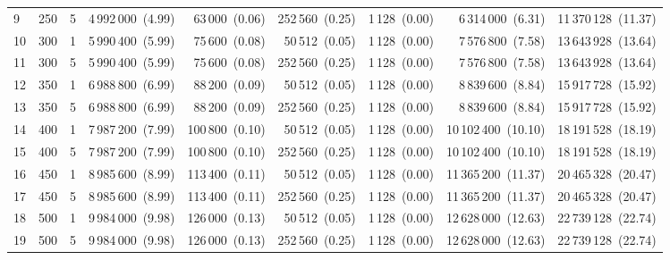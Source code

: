 \begin{tabular}{lllrrrrrr}
\cline{1-9} \cline{2-9}
9 & 250 & 5 & 4\,992\,000~{\footnotesize(4.99)} & 63\,000~{\footnotesize(0.06)} & 252\,560~{\footnotesize(0.25)} & 1\,128~{\footnotesize(0.00)} & 6\,314\,000~{\footnotesize(6.31)} & 11\,370\,128~{\footnotesize(11.37)} \\
\cline{1-9} \cline{2-9}
10 & 300 & 1 & 5\,990\,400~{\footnotesize(5.99)} & 75\,600~{\footnotesize(0.08)} & 50\,512~{\footnotesize(0.05)} & 1\,128~{\footnotesize(0.00)} & 7\,576\,800~{\footnotesize(7.58)} & 13\,643\,928~{\footnotesize(13.64)} \\
\cline{1-9} \cline{2-9}
11 & 300 & 5 & 5\,990\,400~{\footnotesize(5.99)} & 75\,600~{\footnotesize(0.08)} & 252\,560~{\footnotesize(0.25)} & 1\,128~{\footnotesize(0.00)} & 7\,576\,800~{\footnotesize(7.58)} & 13\,643\,928~{\footnotesize(13.64)} \\
\cline{1-9} \cline{2-9}
12 & 350 & 1 & 6\,988\,800~{\footnotesize(6.99)} & 88\,200~{\footnotesize(0.09)} & 50\,512~{\footnotesize(0.05)} & 1\,128~{\footnotesize(0.00)} & 8\,839\,600~{\footnotesize(8.84)} & 15\,917\,728~{\footnotesize(15.92)} \\
\cline{1-9} \cline{2-9}
13 & 350 & 5 & 6\,988\,800~{\footnotesize(6.99)} & 88\,200~{\footnotesize(0.09)} & 252\,560~{\footnotesize(0.25)} & 1\,128~{\footnotesize(0.00)} & 8\,839\,600~{\footnotesize(8.84)} & 15\,917\,728~{\footnotesize(15.92)} \\
\cline{1-9} \cline{2-9}
14 & 400 & 1 & 7\,987\,200~{\footnotesize(7.99)} & 100\,800~{\footnotesize(0.10)} & 50\,512~{\footnotesize(0.05)} & 1\,128~{\footnotesize(0.00)} & 10\,102\,400~{\footnotesize(10.10)} & 18\,191\,528~{\footnotesize(18.19)} \\
\cline{1-9} \cline{2-9}
15 & 400 & 5 & 7\,987\,200~{\footnotesize(7.99)} & 100\,800~{\footnotesize(0.10)} & 252\,560~{\footnotesize(0.25)} & 1\,128~{\footnotesize(0.00)} & 10\,102\,400~{\footnotesize(10.10)} & 18\,191\,528~{\footnotesize(18.19)} \\
\cline{1-9} \cline{2-9}
16 & 450 & 1 & 8\,985\,600~{\footnotesize(8.99)} & 113\,400~{\footnotesize(0.11)} & 50\,512~{\footnotesize(0.05)} & 1\,128~{\footnotesize(0.00)} & 11\,365\,200~{\footnotesize(11.37)} & 20\,465\,328~{\footnotesize(20.47)} \\
\cline{1-9} \cline{2-9}
17 & 450 & 5 & 8\,985\,600~{\footnotesize(8.99)} & 113\,400~{\footnotesize(0.11)} & 252\,560~{\footnotesize(0.25)} & 1\,128~{\footnotesize(0.00)} & 11\,365\,200~{\footnotesize(11.37)} & 20\,465\,328~{\footnotesize(20.47)} \\
\cline{1-9} \cline{2-9}
18 & 500 & 1 & 9\,984\,000~{\footnotesize(9.98)} & 126\,000~{\footnotesize(0.13)} & 50\,512~{\footnotesize(0.05)} & 1\,128~{\footnotesize(0.00)} & 12\,628\,000~{\footnotesize(12.63)} & 22\,739\,128~{\footnotesize(22.74)} \\
\cline{1-9} \cline{2-9}
19 & 500 & 5 & 9\,984\,000~{\footnotesize(9.98)} & 126\,000~{\footnotesize(0.13)} & 252\,560~{\footnotesize(0.25)} & 1\,128~{\footnotesize(0.00)} & 12\,628\,000~{\footnotesize(12.63)} & 22\,739\,128~{\footnotesize(22.74)} \\
\cline{1-9} \cline{2-9}
\bottomrule
\end{tabular}
